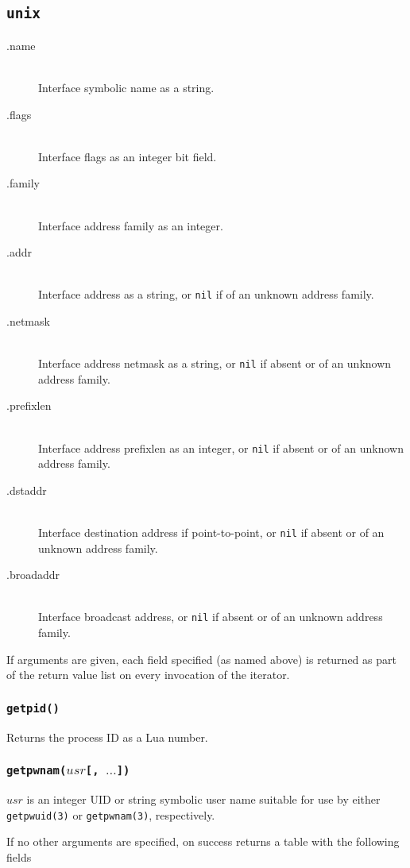 \documentclass[11pt, oneside]{memoir}
\newcommand*{\nil}[0]{\texttt{nil}\xspace}
\newcommand*{\syscall}[1]{\texttt{#1}\xspace}
\newcommand*{\fn}[1]{\texttt{#1}\xspace}
\newcounter{toccols}
\newenvironment{Module}[1]{
	\subsection{\texttt{#1}}
	\addtocontents{toc}{
		\protect\begin{multicols}{\value{toccols}}
	}
}{
	\addtocontents{toc}{\protect\end{multicols}}
}
\begin{document}
\begin{Module}{unix}
\begin{description}
\item[.name] \hfill \\
Interface symbolic name as a string.
\item[.flags] \hfill \\
Interface flags as an integer bit field.
\item[.family] \hfill \\
Interface address family as an integer.
\item[.addr] \hfill \\
Interface address as a string, or \nil if of an unknown address family.
\item[.netmask] \hfill \\
Interface address netmask as a string, or \nil if absent or of an unknown address family.
\item[.prefixlen] \hfill \\
Interface address prefixlen as an integer, or \nil if absent or of an unknown address family.
\item[.dstaddr] \hfill \\
Interface destination address if point-to-point, or \nil if absent or of an unknown address family.
\item[.broadaddr] \hfill \\
Interface broadcast address, or \nil if absent or of an unknown address family.
\end{description}

If arguments are given, each field specified (as named above) is returned as part of the return value list on every invocation of the iterator.


\subsubsection[\fn{getpid}]{\fn{getpid()}}

Returns the process ID as a Lua number.

\subsubsection[\fn{getpwnam}]{\fn{getpwnam($usr$[, $\ldots$])}}

$usr$ is an integer UID or string symbolic user name suitable for use by either \syscall{getpwuid(3)} or \syscall{getpwnam(3)}, respectively.

If no other arguments are specified, on success returns a table with the following fields


\end{Module}
\end{document}
